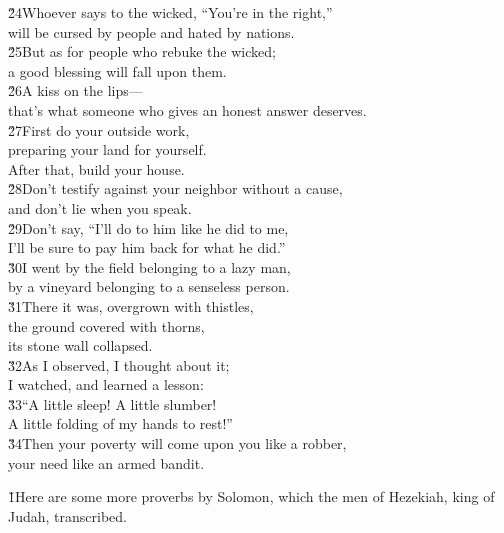 \begin{poetry}
\poeml \v{24}Whoever says to the wicked, ``You're in the right,'' \\
\poemlll       will be cursed by people and hated by nations. \\
\poeml \v{25}But as for people who rebuke the wicked; \\
\poemll    a good blessing will fall upon them. \\
\poeml \v{26}A kiss on the lips--- \\
\poemll    that's what someone who gives an honest answer deserves. \\
\poeml \v{27}First do your outside work, \\
\poemll    preparing your land for yourself. \\
\poemlll       After that, build your house. \\
\poeml \v{28}Don't testify against your neighbor without a cause, \\
\poemll    and don't lie when you speak. \\
\poeml \v{29}Don't say, ``I'll do to him like he did to me, \\
\poemll    I'll be sure to pay him back for what he did.'' \\
\poeml \v{30}I went by the field belonging to a lazy man, \\
\poemll    by a vineyard belonging to a senseless person. \\
\poeml \v{31}There it was, overgrown with thistles, \\
\poemll    the ground covered with thorns, \\
\poemlll       its stone wall collapsed. \\
\poeml \v{32}As I observed, I thought about it; \\
\poemll    I watched, and learned a lesson: \\
\poeml \v{33}``A little sleep! A little slumber! \\
\poemll    A little folding of my hands to rest!'' \\
\poeml \v{34}Then your poverty will come upon you like a robber, \\
\poemll    your need like an armed bandit.
\end{poetry}

\v{1}Here are some more proverbs by Solomon, which the men of Hezekiah, king of Judah, transcribed.

